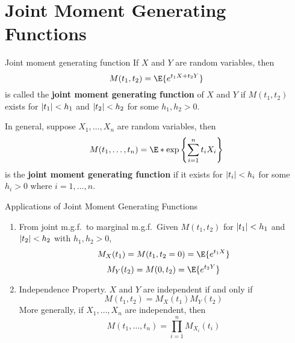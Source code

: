 \section{Joint Moment Generating Functions}
\begin{Definition}{Joint moment generating function}{}
    If $ X $ and $ Y $ are random variables, then
    \[ M(t_1,t_2)=\E{e^{t_1X+t_2Y}} \]
    is called the \textbf{joint moment generating function}
    of $ X $ and $ Y $ if $ M(t_1,t_2) $ exists for
    $ \lvert t_1\rvert<h_1 $ and $ \lvert t_2\rvert<h_2 $
    for some $ h_1,h_2>0 $.
\end{Definition}
\begin{Remark}{}{}
    In general, suppose $ X_1,\ldots,X_n $ are random variables,
    then
    \[ M(t_1,\ldots,t_n)=\E*{\exp\left\{ \sum_{i=1}^{n} t_i X_i\right\}} \]
    is the \textbf{joint moment generating function}
    if it exists for $ \lvert t_i\rvert<h_i $
    for some $ h_i>0 $ where $ i=1,\ldots,n $.
\end{Remark}
\begin{Remark}{Applications of Joint Moment Generating Functions}{}
    \begin{enumerate}[label=(\arabic*)]
        \item From joint m.g.f.\ to marginal m.g.f.\
              Given $ M(t_1,t_2) $ for $ \lvert t_1\rvert<h_1 $
              and $ \lvert t_2\rvert<h_2 $
              with $ h_1,h_2>0 $,
              \[ M_X(t_1)=M(t_1,t_2=0)=\E{e^{t_1X}} \]
              \[ M_Y(t_2)=M(0,t_2)=\E{e^{t_2Y}} \]
        \item Independence Property. $ X $ and
              $ Y $ are independent if and only if
              \[ M(t_1,t_2)=M_X(t_1)M_Y(t_2) \]
              More generally, if $ X_1,\ldots,X_n $ are
              independent, then
              \[ M(t_1,\ldots,t_n)=\prod_{i=1}^n M_{X_i}(t_i) \]
    \end{enumerate}
\end{Remark}

